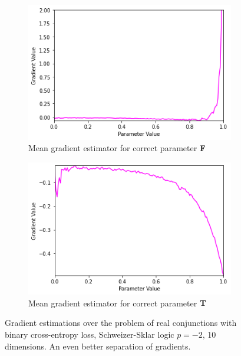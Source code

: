 \begin{figure}[ht]
\begin{subfigure}[b]{0.47\textwidth}
        \includegraphics[width=\textwidth]{imgs/grad_ss_bce_falseparam_10dim_avg.png}
        \caption{Mean gradient estimator for correct parameter $\textbf{F}$}
        \label{fig:conjgrad10falseavgssbce}
    \end{subfigure}
    \begin{subfigure}[b]{0.47\textwidth}
        \centering
        \includegraphics[width=\textwidth]{imgs/grad_ss_bce_trueparam_10dim_avg.png}
        \caption{Mean gradient estimator for correct parameter $\textbf{T}$}
        \label{fig:conjgrad10trueavgssbce}
    \end{subfigure}
       \caption{Gradient estimations over the problem of real conjunctions with binary cross-entropy loss, Schweizer-Sklar logic $p=-2$, 10 dimensions. An even better separation of gradients.}
       \label{fig:conjgrad10ssbce}
\end{figure}

